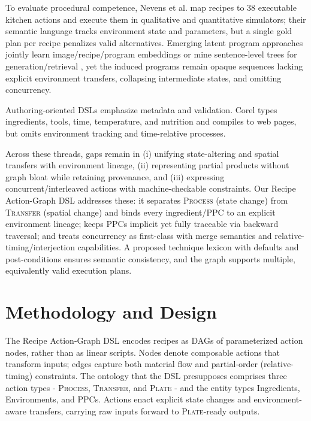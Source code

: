 \documentclass[sigconf]{acmart}
\begin{document}
To evaluate procedural competence, Nevens et al. \cite{nevens2024benchmark} map recipes to 38 executable kitchen actions and execute them in qualitative and quantitative simulators; their semantic language tracks environment state and parameters, but a single gold plan per recipe penalizes valid alternatives. Emerging latent program approaches jointly learn image/recipe/program embeddings \cite{papadopoulos2022programs} or mine sentence-level trees for generation/retrieval \cite{wang2023structural}, yet the induced programs remain opaque sequences lacking explicit environment transfers, collapsing intermediate states, and omitting concurrency.

Authoring-oriented DSLs emphasize metadata and validation. Corel \cite{roorda2021corel} types ingredients, tools, time, temperature, and nutrition and compiles to web pages, but omits environment tracking and time-relative processes.

Across these threads, gaps remain in (i) unifying state-altering and spatial transfers with environment lineage, (ii) representing partial products without graph bloat while retaining provenance, and (iii) expressing concurrent/interleaved actions with machine-checkable constraints. Our Recipe Action-Graph DSL addresses these: it separates \textsc{Process} (state change) from \textsc{Transfer} (spatial change) and binds every ingredient/PPC to an explicit environment lineage; keeps PPCs implicit yet fully traceable via backward traversal; and treats concurrency as first-class with merge semantics and relative-timing/interjection capabilities. A proposed technique lexicon with defaults and post-conditions ensures semantic consistency, and the graph supports multiple, equivalently valid execution plans.

\section{Methodology and Design}

The Recipe Action-Graph DSL encodes recipes as DAGs of parameterized action nodes, rather than as linear scripts. Nodes denote composable actions that transform inputs; edges capture both material flow and partial-order (relative-timing) constraints. The ontology that the DSL presupposes comprises three action types - \textsc{Process}, \textsc{Transfer}, and \textsc{Plate} - and the entity types Ingredients, Environments, and PPCs. Actions enact explicit state changes and environment-aware transfers, carrying raw inputs forward to \textsc{Plate}-ready outputs.
\end{document}
